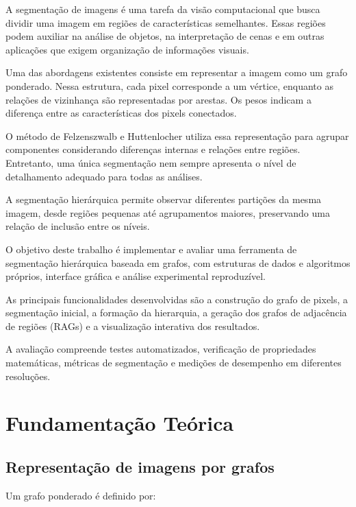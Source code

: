 \documentclass[12pt]{article}
\begin{document}
A segmentação de imagens é uma tarefa da visão computacional
que busca dividir uma imagem em regiões de características
semelhantes. Essas regiões podem auxiliar na análise de
objetos, na interpretação de cenas e em outras aplicações
que exigem organização de informações visuais.

Uma das abordagens existentes consiste em representar a
imagem como um grafo ponderado. Nessa estrutura, cada pixel
corresponde a um vértice, enquanto as relações de vizinhança
são representadas por arestas. Os pesos indicam a diferença
entre as características dos pixels conectados.

O método de Felzenszwalb e Huttenlocher
\cite{felzenszwalb2004} utiliza essa representação
para agrupar componentes considerando diferenças internas
e relações entre regiões. Entretanto, uma única segmentação
nem sempre apresenta o nível de detalhamento adequado
para todas as análises.

A segmentação hierárquica permite observar diferentes
partições da mesma imagem, desde regiões pequenas até
agrupamentos maiores, preservando uma relação de inclusão
entre os níveis.

O objetivo deste trabalho é implementar e avaliar uma
ferramenta de segmentação hierárquica baseada em grafos,
com estruturas de dados e algoritmos próprios, interface
gráfica e análise experimental reproduzível.

As principais funcionalidades desenvolvidas são a
construção do grafo de pixels, a segmentação inicial,
a formação da hierarquia, a geração dos grafos de
adjacência de regiões (RAGs) e a visualização interativa
dos resultados.

A avaliação compreende testes automatizados, verificação
de propriedades matemáticas, métricas de segmentação
e medições de desempenho em diferentes resoluções.

\section{Fundamentação Teórica}
\label{sec:fundamentacao}

\subsection{Representação de imagens por grafos}

Um grafo ponderado é definido por:
\end{document}
